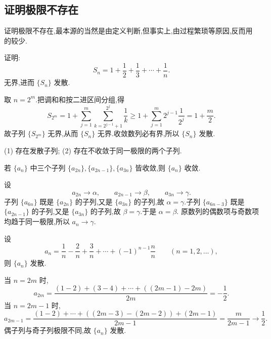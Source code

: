 \subsection{证明极限不存在}

证明极限不存在,最本源的当然是由定义判断,但事实上,由过程繁琐等原因,反而用的较少.




\begin{example}
  证明:
  \[
    S_n=1+\dfrac{1}{2}+\dfrac{1}{3}+\cdots+\dfrac{1}{n}.
  \]
  无界,进而 $\{S_n\}$ 发散.
\end{example}
\exampleblank

\begin{solution}
  取 $n=2^m$.把调和和按二进区间分组,得
  \[
    S_{2^m}
    =1+\sum\limits_{j=1}^m
    \sum\limits_{k=2^{j-1}+1}^{2^j}\dfrac{1}{k}
    \geq1+\sum\limits_{j=1}^m2^{j-1}\dfrac{1}{2^j}
    =1+\dfrac{m}{2}.
  \]
  故子列 $\{S_{2^m}\}$ 无界,从而 $\{S_n\}$ 无界.收敛数列必有界,所以
  $\{S_n\}$ 发散.
\end{solution}




(1) 存在发散子列;
(2) 存在不收敛于同一极限的两个子列.

\begin{example}
  若 $\{a_n\}$ 中三个子列 $\{a_{2n}\},\{a_{2n-1}\},\{a_{3n}\}$ 皆收敛,则 $\{a_n\}$ 收敛.
\end{example}
\exampleblank

\begin{solution}
  设
  \[
    a_{2n}\to\alpha,
    \qquad a_{2n-1}\to\beta,
    \qquad a_{3n}\to\gamma.
  \]
  子列 $\{a_{6n}\}$ 既是 $\{a_{2n}\}$ 的子列,又是 $\{a_{3n}\}$ 的子列,故
  $\alpha=\gamma$.子列 $\{a_{6n-3}\}$ 既是 $\{a_{2n-1}\}$ 的子列,又是
  $\{a_{3n}\}$ 的子列,故 $\beta=\gamma$.于是 $\alpha=\beta$.
  原数列的偶数项与奇数项均趋于同一极限,所以 $a_n\to\gamma$.
\end{solution}

\begin{example}
  设
  \[
    a_n=\dfrac{1}{n}-\dfrac{2}{n}+\dfrac{3}{n}+\cdots+(-1)^{n-1}\dfrac{n}{n}
    \qquad(n=1,2,\ldots),
  \]
  则 $\{a_n\}$ 发散.
\end{example}
\exampleblank

\begin{solution}
  当 $n=2m$ 时,
  \[
    a_{2m}=\dfrac{(1-2)+(3-4)+\cdots+((2m-1)-2m)}{2m}
    =-\dfrac{1}{2}.
  \]
  当 $n=2m-1$ 时,
  \[
    a_{2m-1}
    =\dfrac{(1-2)+\cdots+((2m-3)-(2m-2))+(2m-1)}{2m-1}
    =\dfrac{m}{2m-1}\longrightarrow\dfrac{1}{2}.
  \]
  偶子列与奇子列极限不同,故 $\{a_n\}$ 发散.
\end{solution}

